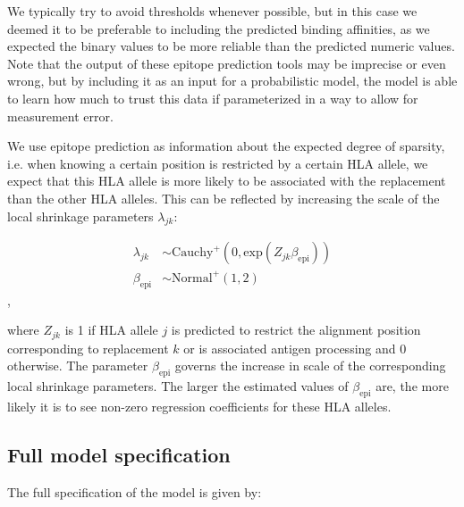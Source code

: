 \documentclass[fleqn,11pt]{SelfArx} %
\begin{document}
We typically try to avoid thresholds whenever possible, but in this case we deemed it to be preferable to including the predicted binding affinities, as we expected the binary values to be more reliable than the predicted numeric values.
Note that the output of these epitope prediction tools may be imprecise or even wrong, but by including it as an input for a probabilistic model, the model is able to learn how much to trust this data if parameterized in a way to allow for measurement error.

We use epitope prediction as information about the expected degree of sparsity, i.e. when knowing a certain position is restricted by a certain HLA allele, we expect that this HLA allele is more likely to be associated with the replacement than the other HLA alleles.
This can be reflected by increasing the scale of the local shrinkage parameters \(\lambda_{jk}\):

\begin{equation}
  \begin{aligned}
    \lambda_{jk} &\sim \text{Cauchy}^{+}(0, \text{exp}(Z_{jk}\beta_{\text{epi}})) \\
    \beta_{\text{epi}} &\sim \text{Normal}^{+}(1, 2)
  \end{aligned}
\end{equation},
 
where \(Z_{jk}\) is 1 if HLA allele \(j\) is predicted to restrict the alignment position corresponding to replacement \(k\) or is associated antigen processing and 0 otherwise.
The parameter \(\beta_{\text{epi}}\) governs the increase in scale of the  corresponding local shrinkage parameters. The larger the estimated values of \(\beta_{\text{epi}}\) are, the more likely it is to see non-zero regression coefficients for these HLA alleles.

\subsection*{Full model specification}

The full specification of the model is given by:
\end{document}
